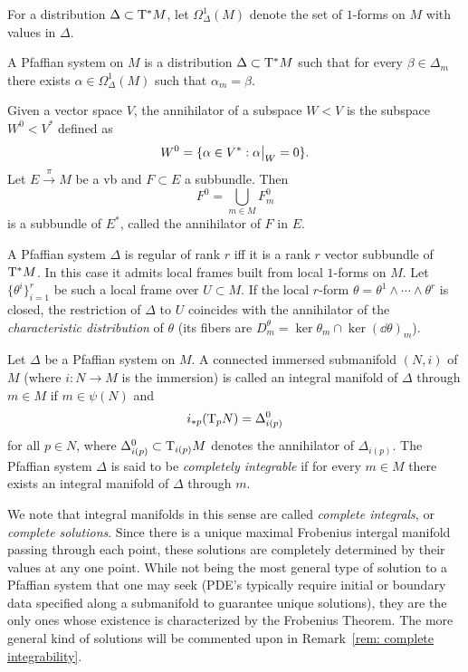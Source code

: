For a distribution $\Delta\subset \mathrm{T}^\ast M$, let $\Omega^1_\Delta(M)$ denote the set of $1$-forms on $M$ with values in $\Delta$.

\begin{defn}
    A Pfaffian system on $M$ is a distribution $\Delta\subset \mathrm{T}^\ast M$ such that for every $\beta\in\Delta_m$ there exists $\alpha\in\Omega^1_\Delta(M)$ such that $\alpha_m=\beta$.
\end{defn}

\begin{defn}[Annihilator]
    Given a vector space $V$, the annihilator of a subspace $W<V$ is the subspace $W^0<V^\ast$ defined as
    \[W^0=\{\alpha\in V^\ast: \restr{\alpha}{W}=0 \}.\]
    Let $E\overset{\pi}{\to}M$ be a \gls{vb} and $F\subset E$ a subbundle. Then
    \[F^0=\bigcup_{m\in M}F_m^0\]
    is a subbundle of $E^\ast$, called the annihilator of $F$ in $E$.
\end{defn}


\begin{rem}
    A Pfaffian system $\Delta$ is regular of rank $r$ iff it is a rank $r$ vector subbundle of $\mathrm{T}^\ast M$. In this case it admits local frames built from local $1$-forms on $M$. Let $\{\theta^i\}_{i=1}^r$ be such a local frame over $U\subset M$. If the local $r$-form $\theta=\theta^1\wedge\cdots\wedge\theta^r$ is closed, the restriction of $\Delta$ to $U$ coincides with the annihilator of the \emph{characteristic distribution} of $\theta$ (its fibers are $D^\theta_m=\ker\theta_m\cap \ker(\dd\theta)_m$).
\end{rem}

\begin{defn}
    Let $\Delta$ be a Pfaffian system on $M$. A connected immersed submanifold $(N,i)$ of $M$ (where $i:N\to M$ is the immersion) is called an integral manifold of $\Delta$ through $m\in M$ if $m\in\psi(N)$ and 
    \[i_{\ast p}(\mathrm{T}_pN)=\Delta_{i(p)}^0\]
    for all $p\in N$, where $\Delta_{i(p)}^0\subset \mathrm{T}_{i(p)}M$ denotes the annihilator of $\Delta_{i(p)}$. The Pfaffian system $\Delta$ is said to be \emph{completely integrable} if for every $m\in M$ there exists an integral manifold of $\Delta$ through $m$.
\end{defn}

We note that integral manifolds in this sense are called \emph{complete integrals}, or \emph{complete solutions}. Since there is a unique maximal Frobenius intergal manifold passing through each point, these solutions are completely determined by their values at any one point. While not being the most general type of solution to a Pfaffian system that one may seek (PDE's typically require initial or boundary data specified along a submanifold to guarantee unique solutions), they are the only ones whose existence is characterized by the Frobenius Theorem. The more general kind of solutions will be commented upon in Remark~\ref{rem: complete integrability}.

